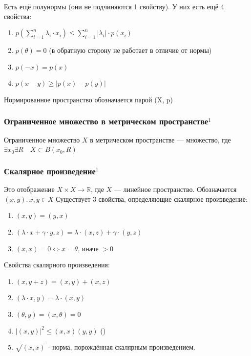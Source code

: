 \documentclass{article}
\begin{document}
Есть ещё полунормы (они не подчиняются 1 свойству). У них есть ещё 4 свойства:
\begin{enumerate}
    \item $p(\sum\limits_{i=1}^n \lambda_i \cdot x_i) \le \sum\limits_{i=1}^n |\lambda_i| \cdot p(x_i)$
    \item $p(\theta) = 0$ (в обратную сторону не работает в отличие от нормы)
    \item $p(-x) = p(x)$
    \item $p(x-y) \ge |p(x) - p(y)|$
\end{enumerate}

Нормированное пространство обозначается парой (X, p)

\subsubsection{Ограниченное множество в метрическом пространстве\texorpdfstring{$^1$}{}}
Ограниченное множество $X$ в метрическом пространстве --- множество, где $\exists x_0 \exists R \quad X \subset B(x_0, R)$

\subsubsection{Скалярное произведение\texorpdfstring{$^1$}{}}
Это отображение $X \times X \rightarrow \mathbb{R}$, где $X$ --- линейное пространство. Обозначается $(x, y).\, x, y \in X$ Существует 3 свойства, определяющие скалярное произведение:
\begin{enumerate}
    \item $(x, y) = (y, x)$
    \item $(\lambda \cdot x + \gamma \cdot y, z) = \lambda \cdot (x, z) + \gamma \cdot (y, z)$
    \item $(x, x) = 0 \Leftrightarrow x = \theta$, иначе $>0$
\end{enumerate}

Свойства скалярного произведения:
\begin{enumerate}
    \item $(x, y + z) = (x, y) + (x, z)$
    \item $(\lambda \cdot x, y) = \lambda \cdot (x, y)$
    \item $(\theta, y) = (x, \theta) = 0$
    \item $|(x, y)|^2 \le (x, x)(y, y)$ ()
    \item $\sqrt{(x, x)}$ - норма, порождённая скалярным произведением.
\end{enumerate}
\end{document}
